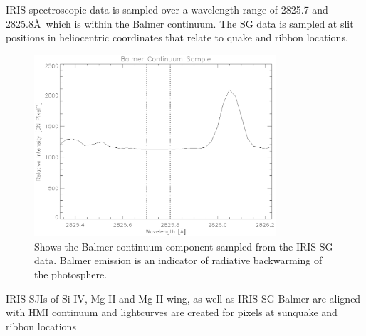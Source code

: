 IRIS spectroscopic data is sampled over a wavelength range of 2825.7 and 2825.8\AA\ which is within the Balmer continuum. The SG data is sampled at slit positions in heliocentric coordinates that relate to quake and ribbon locations.

\begin{figure}%
  \begin{center}
  \includegraphics[width=0.8\textwidth]{29-Mar-14-Balmer-Continuum}
  \end{center}
  \caption{Shows the Balmer continuum component sampled from the IRIS SG data. Balmer emission is an indicator of radiative backwarming of the photosphere. }\label{balmercontinuum}
\end{figure}



IRIS SJIs of Si IV, Mg II and Mg II wing, as well as IRIS SG Balmer are aligned with HMI continuum and lightcurves are created for pixels at sunquake and ribbon locations %

